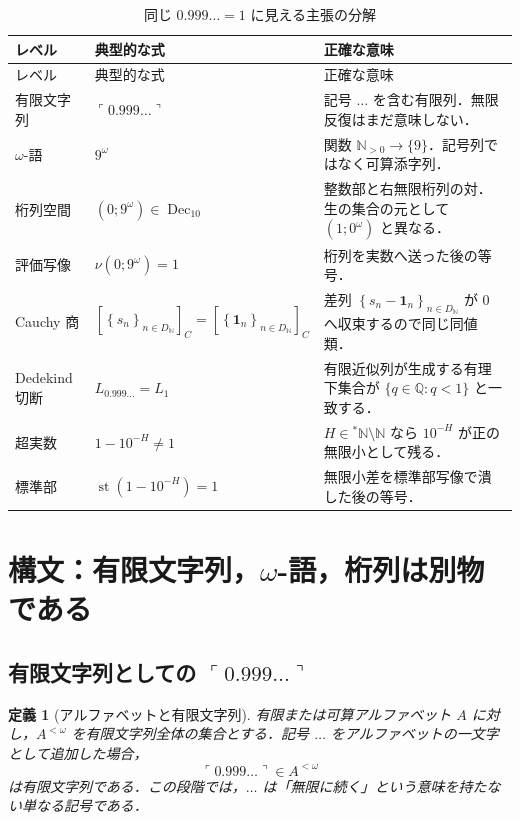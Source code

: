 \documentclass[a4paper,11pt]{ltjsarticle}
\theoremstyle{jpdef}
\newtheorem{definition}{定義}[section]
\theoremstyle{jpthm}
\newcommand{\N}{\mathbb{N}}
\newcommand{\Q}{\mathbb{Q}}
\newcommand{\Dec}{\operatorname{Dec}_{10}}
\newcommand{\st}{\operatorname{st}}
\newcommand{\Ns}{\N_{>0}}
\newcommand{\DN}{D_{\N}}
\newcommand{\seq}[2]{\left\{#1\right\}_{#2}}
\newcommand{\ulim}[1]{{}^{\ast}#1}
\begin{document}
\clearpage
\begin{longtable}{L{30mm}L{43mm}L{75mm}}
\caption{同じ \(0.999\ldots=1\) に見える主張の分解}\label{tab:package}\\
\toprule
レベル & 典型的な式 & 正確な意味 \\
\midrule
\endfirsthead
\toprule
レベル & 典型的な式 & 正確な意味 \\
\midrule
\endhead
有限文字列 & \(\ulcorner 0.999\ldots\urcorner\) & 記号 \(\ldots\) を含む有限列．無限反復はまだ意味しない．\\
\(\omega\)-語 & \(9^\omega\) & 関数 \(\Ns\to\{9\}\)．記号列ではなく可算添字列．\\
桁列空間 & \((0;9^\omega)\in\Dec\) & 整数部と右無限桁列の対．生の集合の元として \((1;0^\omega)\) と異なる．\\
評価写像 & \(\nu(0;9^\omega)=1\) & 桁列を実数へ送った後の等号．\\
Cauchy 商 & \([\seq{s_n}{n\in\DN}]_C=[\seq{\mathbf 1_n}{n\in\DN}]_C\) & 差列 \(\seq{s_n-\mathbf1_n}{n\in\DN}\) が \(0\) へ収束するので同じ同値類．\\
Dedekind 切断 & \(L_{0.999\ldots}=L_1\) & 有限近似列が生成する有理下集合が \(\{q\in\Q:q<1\}\) と一致する．\\
超実数 & \(1-10^{-H}\ne1\) & \(H\in\ulim\N\setminus\N\) なら \(10^{-H}\) が正の無限小として残る．\\
標準部 & \(\st(1-10^{-H})=1\) & 無限小差を標準部写像で潰した後の等号．\\
\bottomrule
\end{longtable}

\section{構文：有限文字列，\(\omega\)-語，桁列は別物である}

\subsection{有限文字列としての \(\ulcorner0.999\ldots\urcorner\)}

\begin{definition}[アルファベットと有限文字列]
有限または可算アルファベット \(A\) に対し，\(A^{<\omega}\) を有限文字列全体の集合とする．記号 \(\ldots\) をアルファベットの一文字として追加した場合，
\[
  \ulcorner0.999\ldots\urcorner\in A^{<\omega}
\]
は有限文字列である．この段階では，\(\ldots\) は「無限に続く」という意味を持たない単なる記号である．
\end{definition}
\end{document}

